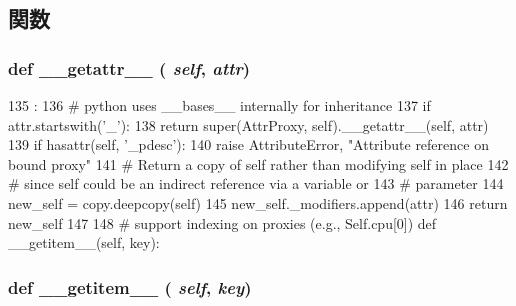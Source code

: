 \subsection{関数}
\hypertarget{classm5_1_1proxy_1_1AttrProxy_a0a990b3ec3889d40889daca9ee5e4695}{
\subsubsection[{\_\-\_\-getattr\_\-\_\-}]{\setlength{\rightskip}{0pt plus 5cm}def \_\-\_\-getattr\_\-\_\- ( {\em self}, \/   {\em attr})}}
\label{classm5_1_1proxy_1_1AttrProxy_a0a990b3ec3889d40889daca9ee5e4695}



\begin{DoxyCode}
135                                :
136         # python uses __bases__ internally for inheritance
137         if attr.startswith('_'):
138             return super(AttrProxy, self).__getattr__(self, attr)
139         if hasattr(self, '_pdesc'):
140             raise AttributeError, "Attribute reference on bound proxy"
141         # Return a copy of self rather than modifying self in place
142         # since self could be an indirect reference via a variable or
143         # parameter
144         new_self = copy.deepcopy(self)
145         new_self._modifiers.append(attr)
146         return new_self
147 
148     # support indexing on proxies (e.g., Self.cpu[0])
    def __getitem__(self, key):
\end{DoxyCode}
\hypertarget{classm5_1_1proxy_1_1AttrProxy_a50d766f4276c3d8fe330ac8cd344a75f}{
\subsubsection[{\_\-\_\-getitem\_\-\_\-}]{\setlength{\rightskip}{0pt plus 5cm}def \_\-\_\-getitem\_\-\_\- ( {\em self}, \/   {\em key})}}
\label{classm5_1_1proxy_1_1AttrProxy_a50d766f4276c3d8fe330ac8cd344a75f}



